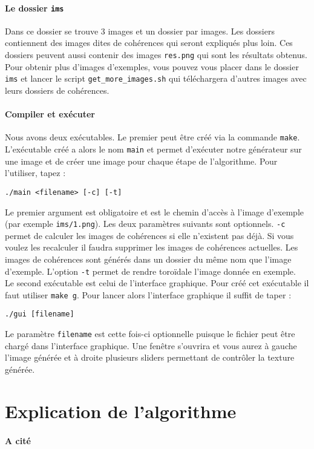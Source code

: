 \documentclass[12pt]{article}
\begin{document}
\paragraph{Le dossier \texttt{ims}}
Dans ce dossier se trouve 3 images et un dossier par images. Les dossiers contiennent des images dites de cohérences qui seront expliqués plus loin. Ces dossiers peuvent aussi contenir des images \verb|res.png| qui sont les résultats obtenus. Pour obtenir plus d'images d'exemples, vous pouvez vous placer dans le dossier \verb|ims| et lancer le script \verb|get_more_images.sh| qui téléchargera d'autres images avec leurs dossiers de cohérences.

\paragraph{Compiler et exécuter}
Nous avons deux exécutables. Le premier peut être créé via la commande \verb|make|. L'exécutable créé a alors le nom \verb|main| et permet d'exécuter notre générateur sur une image et de créer une image pour chaque étape de l'algorithme. Pour l'utiliser, tapez :
\begin{center}
	\texttt{./main <filename> [-c] [-t]}
\end{center}
Le premier argument est obligatoire et est le chemin d'accès à l'image d'exemple (par exemple \verb|ims/1.png|). Les deux paramètres suivants sont optionnels. \verb|-c| permet de calculer les images de cohérences si elle n'existent pas déjà. Si vous voulez les recalculer il faudra supprimer les images de cohérences actuelles. Les images de cohérences sont générés dans un dossier du même nom que l'image d'exemple. L'option \verb|-t| permet de rendre toroïdale l'image donnée en exemple. \\
Le second exécutable est celui de l'interface graphique. Pour créé cet exécutable il faut utiliser \verb|make g|. Pour lancer alors l'interface graphique il suffit de taper :
\begin{center}
	\verb|./gui [filename]|
\end{center}
Le paramètre \verb|filename| est cette fois-ci optionnelle puisque le fichier peut être chargé dans l'interface graphique. Une fenêtre s'ouvrira et vous aurez à gauche l'image générée et à droite plusieurs sliders permettant de contrôler la texture générée.

\section{Explication de l'algorithme}

\paragraph{A cité}
\cite{Ary++}

\appendix



\end{document}

